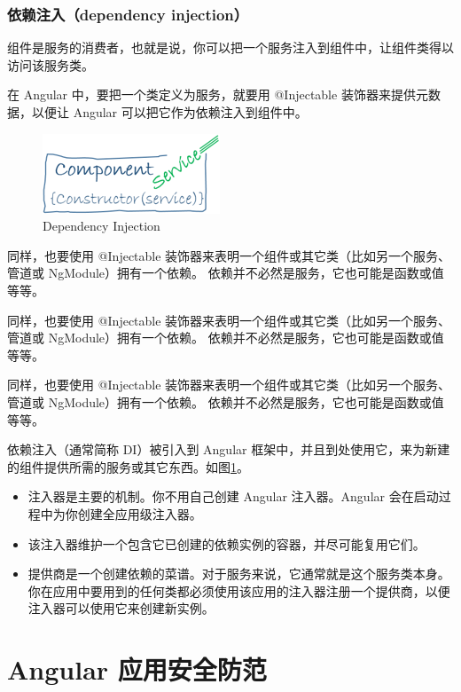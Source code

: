 \documentclass{progbookcn}
\begin{document}
\section{依赖注入（dependency injection）}


组件是服务的消费者，也就是说，你可以把一个服务注入到组件中，让组件类得以访问该服务类。

在 Angular 中，要把一个类定义为服务，就要用 @Injectable 装饰器来提供元数据，以便让 Angular 可以把它作为依赖注入到组件中。

\begin{figure}
  \centering
  \includegraphics[scale=.7]{figs/dependency-injection.png}
  \caption{Dependency Injection}
  \label{fig:di}
\end{figure}

同样，也要使用 @Injectable 装饰器来表明一个组件或其它类（比如另一个服务、管道或 NgModule）拥有一个依赖。 依赖并不必然是服务，它也可能是函数或值等等。

同样，也要使用 @Injectable 装饰器来表明一个组件或其它类（比如另一个服务、管道或 NgModule）拥有一个依赖。 依赖并不必然是服务，它也可能是函数或值等等。

同样，也要使用 @Injectable 装饰器来表明一个组件或其它类（比如另一个服务、管道或 NgModule）拥有一个依赖。 依赖并不必然是服务，它也可能是函数或值等等。

依赖注入（通常简称 DI）被引入到 Angular 框架中，并且到处使用它，来为新建的组件提供所需的服务或其它东西。如图\ref{fig:di}。

\begin{itemize}
  \item 注入器是主要的机制。你不用自己创建 Angular 注入器。Angular 会在启动过程中为你创建全应用级注入器。
  \item 该注入器维护一个包含它已创建的依赖实例的容器，并尽可能复用它们。
  \item 提供商是一个创建依赖的菜谱。对于服务来说，它通常就是这个服务类本身。你在应用中要用到的任何类都必须使用该应用的注入器注册一个提供商，以便注入器可以使用它来创建新实例。
\end{itemize}


\part{Angular 应用安全防范}
\end{document}
